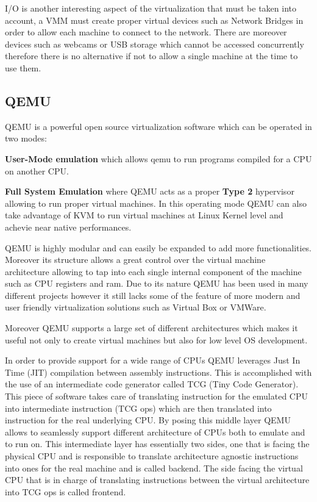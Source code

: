 I/O is another interesting aspect of the virtualization that must be taken into account, a VMM must create proper virtual devices such as Network Bridges in order to allow each machine to connect to the network. There are moreover devices such as webcams or USB storage which cannot be accessed concurrently therefore there is no alternative if not to allow a single machine at the time to use them.

\subsection{QEMU}

QEMU is a powerful open source virtualization software which can be operated in two modes: 

\textbf{User-Mode emulation} which allows qemu to run programs compiled for a CPU on another CPU.

\textbf{Full System Emulation} where QEMU acts as a proper \textbf{Type 2} hypervisor allowing to run proper virtual machines. In this operating mode QEMU can also take advantage of KVM to run virtual machines at Linux Kernel level and achevie near native performances. 

QEMU is highly modular and can easily be expanded to add more functionalities. Moreover its structure allows a great control over the virtual machine architecture allowing to tap into each single internal component of the machine such as CPU registers and ram. Due to its nature QEMU has been used in many different projects however it still lacks some of the feature of more modern and user friendly virtualization solutions such as Virtual Box or VMWare.

Moreover QEMU supports a large set of different architectures which makes it useful not only to create virtual machines but also for low level OS development.

In order to provide support for a wide range of CPUs QEMU leverages Just In Time (JIT) compilation between assembly instructions. This is accomplished with the use of an intermediate code generator called TCG (Tiny Code Generator). This piece of software takes care of translating instruction for the emulated CPU into intermediate instruction (TCG ops) which are then translated into instruction for the real underlying CPU. By posing this middle layer QEMU allows to seamlessly support different architecture of CPUs both to emulate and to run on. This intermediate layer has essentially two sides, one that is facing the physical CPU and is responsible to translate architecture agnostic instructions into ones for the real machine and is called backend. The side facing the virtual CPU that is in charge of translating instructions between the virtual architecture into TCG ops is called frontend.

